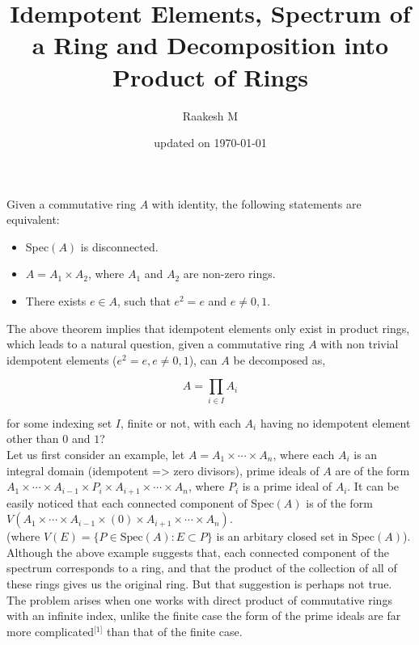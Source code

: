 \documentclass[11pt,a4paper]{colorart}
\title{\Huge Idempotent Elements, Spectrum of a Ring and Decomposition into Product of Rings}
\author{Raakesh M}
\date{updated on \today}
\begin{document}
\maketitle


\begin{theorem}
	Given a commutative ring $A$ with identity, the following statements are equivalent:

	\begin{itemize}
		\item Spec$(A)$ is disconnected.
		\item $A = A_1 \times A_2$, where $A_1$ and $A_2$ are non-zero rings.
		\item There exists $e \in A$, such that $e^2 = e$ and $e \neq 0,1$.
	\end{itemize}

\end{theorem}

The above theorem implies that idempotent elements only exist in product rings, which leads to a natural question, given a commutative ring $A$ with non trivial idempotent elements ($e^2=e, e \neq 0,1$), can $A$ be decomposed as,

\[ A = \prod_{i \in I} A_i \]

for some indexing set $I$, finite or not, with each $A_i$ having no idempotent element other than $0$ and $1$?\\

Let us first consider an example, let $A = A_1 \times \cdots \times A_n$, where each $A_i$ is an integral domain (idempotent => zero divisors), prime ideals of $A$ are of the form $A_1 \times \cdots \times A_{i-1} \times P_i \times A_{i+1} \times \cdots \times A_n$, where $P_i$ is a prime ideal of $A_i$. It can be easily noticed that each connected component of Spec$(A)$ is of the form $V( A_1 \times \cdots \times A_{i-1} \times (0) \times A_{i+1} \times \cdots \times A_n)$.\\

(where $V(E) = \{P \in \text{Spec}(A) : E \subset P\}$ is an arbitary closed set in Spec$(A)$).\\

Although the above example suggests that, each connected component of the spectrum corresponds to a ring, and that the product of the collection of all of these rings gives us the original ring. But that suggestion is perhaps not true.\\ 

The problem arises when one works with direct product of commutative rings with an infinite index, unlike the finite case the form of the prime ideals are far more complicated$^\text{[1]}$ than that of the finite case.\\
\end{document}
